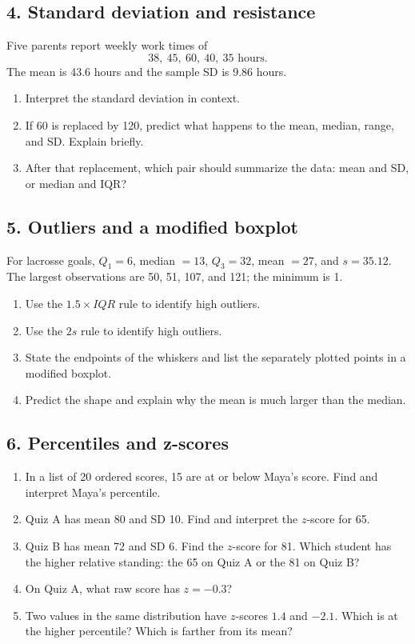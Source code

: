 \documentclass[11pt]{article}
\newcommand{\longwork}{\vspace{0.55in}\hrulefill}
\begin{document}
\subsection*{4. Standard deviation and resistance}
Five parents report weekly work times of
\[
38,\ 45,\ 60,\ 40,\ 35\text{ hours}.
\]
The mean is 43.6 hours and the sample SD is 9.86 hours.

\begin{enumerate}[label=\alph*.]
  \item Interpret the standard deviation in context.
  \item If 60 is replaced by 120, predict what happens to the mean, median, range, and SD. Explain briefly.
  \item After that replacement, which pair should summarize the data: mean and SD, or median and IQR?
\end{enumerate}
\longwork

\subsection*{5. Outliers and a modified boxplot}
For lacrosse goals, $Q_1=6$, median $=13$, $Q_3=32$, mean $=27$, and $s=35.12$. The largest observations are 50, 51, 107, and 121; the minimum is 1.

\begin{enumerate}[label=\alph*.]
  \item Use the $1.5\times IQR$ rule to identify high outliers.
  \item Use the $2s$ rule to identify high outliers.
  \item State the endpoints of the whiskers and list the separately plotted points in a modified boxplot.
  \item Predict the shape and explain why the mean is much larger than the median.
\end{enumerate}
\longwork

\newpage
\subsection*{6. Percentiles and z-scores}
\begin{enumerate}[label=\alph*.]
  \item In a list of 20 ordered scores, 15 are at or below Maya's score. Find and interpret Maya's percentile.
  \item Quiz A has mean 80 and SD 10. Find and interpret the $z$-score for 65.
  \item Quiz B has mean 72 and SD 6. Find the $z$-score for 81. Which student has the higher relative standing: the 65 on Quiz A or the 81 on Quiz B?
  \item On Quiz A, what raw score has $z=-0.3$?
  \item Two values in the same distribution have $z$-scores $1.4$ and $-2.1$. Which is at the higher percentile? Which is farther from its mean?
\end{enumerate}
\longwork
\end{document}
